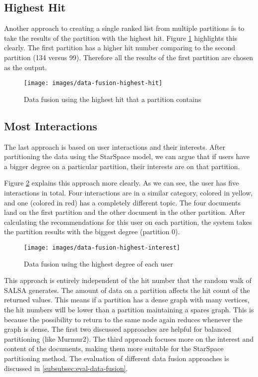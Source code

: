 \subsection{Highest Hit}
\label{subsec:data-fusion-highest-hit}
Another approach to creating a single ranked list from multiple partitions is to take the results of the partition with the highest hit. Figure \ref{fig:data-fusion-highest-hit} highlights this clearly. The first partition has a higher hit number comparing to the second partition (134 versus 99). Therefore all the results of the first partition are chosen as the output.
\begin{figure}[!ht]
	\centering
	\texttt{[image: images/data-fusion-highest-hit]}
	\caption{Data fusion using the highest hit that a partition contains}
	\label{fig:data-fusion-highest-hit}
\end{figure}

\subsection{Most Interactions}
\label{subsec:data-fusion-most-interactions}
The last approach is based on user interactions and their interests. After partitioning the data using the StarSpace model, we can argue that if users have a bigger degree on a particular partition, their interests are on that partition.


Figure \ref{fig:data-fusion-highest-ineterest} explains this approach more clearly. As we can see, the user has five interactions in total. Four interactions are in a similar category, colored in yellow, and one (colored in red) has a completely different topic. The four documents land on the first partition and the other document in the other partition. After calculating the recommendations for this user on each partition, the system takes the partition results with the biggest degree (partition 0).


\begin{figure}[!ht]
	\centering
	\texttt{[image: images/data-fusion-highest-interest]}
	\caption{Data fusion using the highest degree of each user}
	\label{fig:data-fusion-highest-ineterest}
\end{figure}


This approach is entirely independent of the hit number that the random walk of SALSA generates. The amount of data on a partition affects the hit count of the returned values. This means if a partition has a dense graph with many vertices, the hit numbers will be lower than a partition maintaining a spares graph. This is because the possibility to return to the same node again reduces whenever the graph is dense. The first two discussed approaches are helpful for balanced partitioning (like Murmur2). The third approach focuses more on the interest and content of the documents, making them more suitable for the StarSpace partitioning method. The evaluation of different data fusion approaches is discussed in \ref{subsubsec:eval-data-fusion}.

